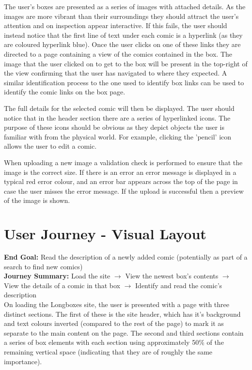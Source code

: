 \documentclass{scrreprt}
\begin{document}
The user's boxes are presented as a series of images with attached details. As the images are more vibrant than their surroundings they should attract the user's attention and on inspection appear interactive. If this fails, the user should instead notice that the first line of text under each comic is a hyperlink (as they are coloured hyperlink blue). Once the user clicks on one of these links they are directed to a page containing a view of the comics contained in the box. The image that the user clicked on to get to the box will be present in the top-right of the view confirming that the user has navigated to where they expected. A similar identification process to the one used to identify box links can be used to identify the comic links on the box page.

The full details for the selected comic will then be displayed. The user should notice that in the header section there are a series of hyperlinked icons. The purpose of these icons should be obvious as they depict objects the user is familiar with from the physical world. For example, clicking the 'pencil' icon allows the user to edit a comic.

When uploading a new image a validation check is performed to ensure that the image is the correct size. If there is an error an error message is displayed in a typical red error colour, and an error bar appears across the top of the page in case the user misses the error message. If the upload is successful then a preview of the image is shown.


\clearpage
\section{User Journey - Visual Layout}

\textbf{End Goal:} Read the description of a newly added comic (potentially as part of a search to find new comics)\\
\textbf{Journey Summary:} Load the site $\rightarrow$ View the newest box's contents $\rightarrow$ View the details of a comic in that box $\rightarrow$ Identify and read the comic's description\\

On loading the Longboxes site, the user is presented with a page with three distinct sections. The first of these is the site header, which has it's background and text colours inverted (compared to the rest of the page) to mark it as separate to the main content on the page. The second and third sections contain a series of box elements with each section using approximately 50\% of the remaining vertical space (indicating that they are of roughly the same importance).
\end{document}

